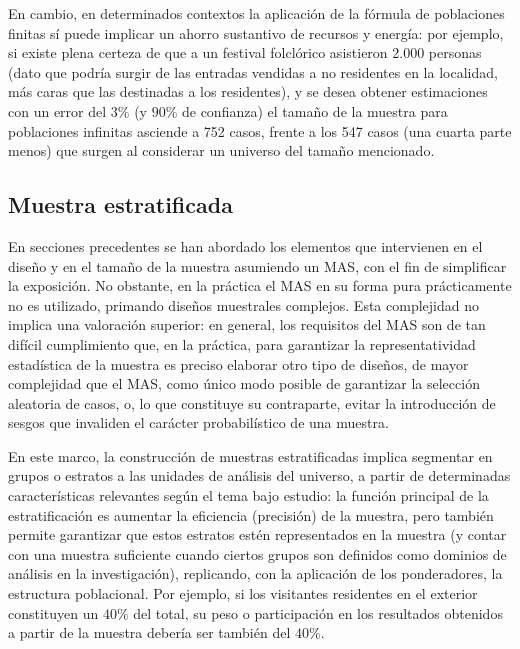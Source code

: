 \documentclass[
]{book}
\begin{document}
En cambio, en determinados contextos la aplicación de la fórmula de poblaciones finitas sí puede implicar un ahorro sustantivo de recursos y energía: por ejemplo, si existe plena certeza de que a un festival folclórico asistieron 2.000 personas (dato que podría surgir de las entradas vendidas a no residentes en la localidad, más caras que las destinadas a los residentes), y se desea obtener estimaciones con un error del \(3\%\) (y \(90\%\) de confianza) el tamaño de la muestra para poblaciones infinitas asciende a 752 casos, frente a los 547 casos (una cuarta parte menos) que surgen al considerar un universo del tamaño mencionado.

\hypertarget{muestra-estratificada}{%
\subsection{Muestra estratificada}\label{muestra-estratificada}}

En secciones precedentes se han abordado los elementos que intervienen en el diseño y en el tamaño de la muestra asumiendo un MAS, con el fin de simplificar la exposición. No obstante, en la práctica el MAS en su forma pura prácticamente no es utilizado, primando diseños muestrales complejos. Esta complejidad no implica una valoración superior: en general, los requisitos del MAS son de tan difícil cumplimiento que, en la práctica, para garantizar la representatividad estadística de la muestra es preciso elaborar otro tipo de diseños, de mayor complejidad que el MAS, como único modo posible de garantizar la selección aleatoria de casos, o, lo que constituye su contraparte, evitar la introducción de sesgos que invaliden el carácter probabilístico de una muestra.

En este marco, la construcción de muestras estratificadas implica segmentar en grupos o estratos a las unidades de análisis del universo, a partir de determinadas características relevantes según el tema bajo estudio: la función principal de la estratificación es aumentar la eficiencia (precisión) de la muestra, pero también permite garantizar que estos estratos estén representados en la muestra (y contar con una muestra suficiente cuando ciertos grupos son definidos como dominios de análisis en la investigación), replicando, con la aplicación de los ponderadores, la estructura poblacional. Por ejemplo, si los visitantes residentes en el exterior constituyen un \(40\%\) del total, su peso o participación en los resultados obtenidos a partir de la muestra debería ser también del \(40\%\).
\end{document}
